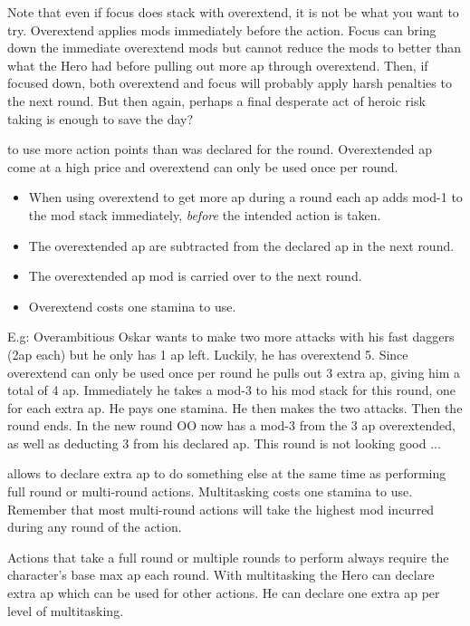 Note that even if focus does stack with overextend, it is not be what you want to try. Overextend applies mods immediately before the action. Focus can bring down the immediate overextend mods but cannot reduce the mods to better than what the Hero had before pulling out more ap through overextend. Then, if focused down, both overextend and focus will probably apply harsh penalties to the next round. But then again, perhaps a final desperate act of heroic risk taking is enough to save the day?


 to use more action points than was declared for the round. Overextended ap come at a high price and overextend can only be used once per round.
\begin{itemize}
    \item When using overextend to get more ap during a round each ap adds mod-1 to the mod stack immediately, \emph{before} the intended action is taken.
    \item The overextended ap are subtracted from the declared ap in the next round.
    \item The overextended ap mod is carried over to the next round.
    \item Overextend costs one stamina to use.
\end{itemize}

E.g: Overambitious Oskar wants to make two more attacks with his fast daggers (2ap each) but he only has 1 ap left. Luckily, he has overextend 5. Since overextend can only be used once per round he pulls out 3 extra ap, giving him a total of 4 ap. Immediately he takes a mod-3 to his mod stack for this round, one for each extra ap. He pays one stamina. He then makes the two attacks. Then the round ends. In the new round OO now has a mod-3 from the 3 ap overextended, as well as deducting 3 from his declared ap. This round is not looking good ...


 allows to declare extra ap to do something else at the same time as performing full round or multi-round actions. Multitasking costs one stamina to use. Remember that most multi-round actions will take the highest mod incurred during any round of the action.

Actions that take a full round or multiple rounds to perform always require the character's base max ap each round. With multitasking the Hero can declare extra ap which can be used for other actions. He can declare one extra ap per level of multitasking.

